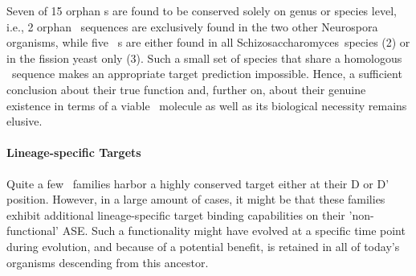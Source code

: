 Seven of 15 orphan \haca s are found to be conserved solely on genus
or species level, i.e., 2 orphan \ncr\ sequences are exclusively found
in the two other Neurospora organisms, while five \spo\ \sno s are
either found in all Schizosaccharomyces\ species (2) or in the fission
yeast only (3). Such a small set of species that share a homologous
\sno\ sequence makes an appropriate target prediction
impossible. Hence, a sufficient conclusion about their true function
and, further on, about their genuine existence in terms of a viable
\sno\ molecule as well as its biological necessity remains elusive.

\paragraph{\textbf{Lineage-specific Targets}}
Quite a few \cd\ families harbor a highly conserved target either at
their D or D' position. However, in a large amount of cases, it might
be that these families exhibit additional lineage-specific target
binding capabilities on their 'non-functional' ASE. Such a
functionality might have evolved at a specific time point during
evolution, and because of a potential benefit, is retained in all of
today's organisms descending from this ancestor.

